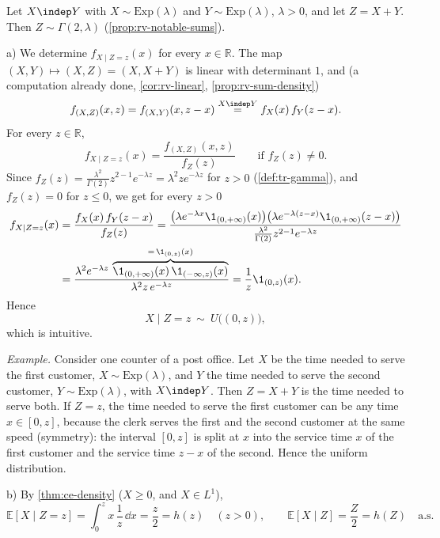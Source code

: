 \begin{example}\label{exa:ce-exponential}
Let $X\indep Y$ with $X\sim\mathrm{Exp}(\lambda)$ and $Y\sim\mathrm{Exp}(\lambda)$, $\lambda>0$,
and let $Z=X+Y$. Then $Z\sim\Gamma(2,\lambda)$ (\cref{prop:rv-notable-sums}).

a) We determine $f_{X\mid Z=z}(x)$ for every $x\in\mathbb R$. The map
$(X,Y)\mapsto(X,Z)=(X,X+Y)$ is linear with determinant $1$, and (a computation already done,
\cref{cor:rv-linear}, \cref{prop:rv-sum-density})
\[
  f_{(X,Z)}(x,z)=f_{(X,Y)}(x,z-x)\overset{X\indep Y}{=}f_X(x)\,f_Y(z-x).
\]
For every $z\in\mathbb R$,
\[
  f_{X\mid Z=z}(x)=\frac{f_{(X,Z)}(x,z)}{f_Z(z)}\qquad\text{if }f_Z(z)\ne0 .
\]
Since $f_Z(z)=\frac{\lambda^2}{\Gamma(2)}z^{2-1}e^{-\lambda z}=\lambda^2ze^{-\lambda z}$ for $z>0$
(\cref{def:tr-gamma}), and $f_Z(z)=0$ for $z\le0$, we get for every $z>0$
\[
\begin{aligned}
  f_{X\mid Z=z}(x)&=\frac{f_X(x)\,f_Y(z-x)}{f_Z(z)}
  =\frac{\big(\lambda e^{-\lambda x}\1_{(0,+\infty)}(x)\big)\big(\lambda e^{-\lambda(z-x)}\1_{(0,+\infty)}(z-x)\big)}
        {\frac{\lambda^2}{\Gamma(2)}z^{2-1}e^{-\lambda z}}\\
  &=\frac{\lambda^2e^{-\lambda z}\,\overbrace{\1_{(0,+\infty)}(x)\,\1_{(-\infty,z)}(x)}^{=\,\1_{(0,z)}(x)}}{\lambda^2z\,e^{-\lambda z}}
  =\frac1z\1_{(0,z)}(x).
\end{aligned}
\]
Hence
\[
  X\mid Z=z\ \sim\ U\big((0,z)\big),
\]
which is intuitive.

\emph{Example.} Consider one counter of a post office. Let $X$ be the time needed to serve the
first customer, $X\sim\mathrm{Exp}(\lambda)$, and $Y$ the time needed to serve the second
customer, $Y\sim\mathrm{Exp}(\lambda)$, with $X\indep Y$. Then $Z=X+Y$ is the time needed to serve
both. If $Z=z$, the time needed to serve the first customer can be any time $x\in[0,z]$, because
the clerk serves the first and the second customer at the same speed (symmetry): the interval
$[0,z]$ is split at $x$ into the service time $x$ of the first customer and the service time $z-x$
of the second. Hence the uniform distribution.

b) By \cref{thm:ce-density} ($X\ge0$, and $X\in L^1$),
\[
  \mathbb E[X\mid Z=z]=\int_0^zx\,\frac1z\,\dd x=\frac z2=h(z)\quad(z>0),\qquad
  \mathbb E[X\mid Z]=\frac Z2=h(Z)\quad\text{a.s.}
\]
\end{example}

